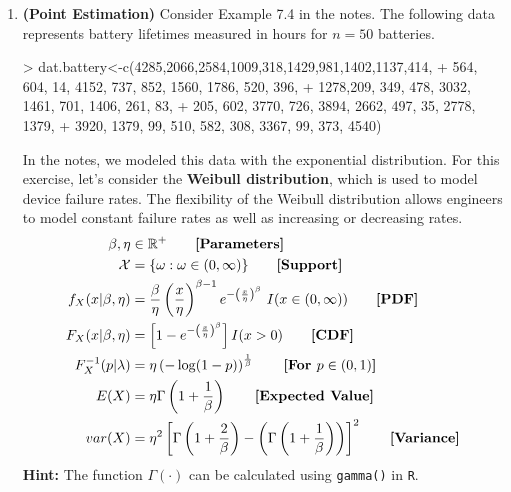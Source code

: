 \documentclass{article}
\begin{document}
\begin{enumerate}
\newpage
\item \textbf{(Point Estimation)} Consider Example 7.4 in the notes.
The following data represents battery lifetimes measured in hours 
for $n=50$ batteries.
\begin{Schunk}
\begin{Sinput}
> dat.battery<-c(4285,2066,2584,1009,318,1429,981,1402,1137,414,
+        564, 604, 14, 4152, 737, 852, 1560, 1786, 520, 396,
+        1278,209, 349, 478, 3032, 1461, 701, 1406, 261, 83,
+        205, 602, 3770, 726, 3894, 2662, 497, 35, 2778, 1379,
+        3920, 1379, 99, 510, 582, 308, 3367, 99, 373, 4540)
\end{Sinput}
\end{Schunk}
In the notes, we modeled this data with the exponential distribution. For this exercise, let's
consider the \textbf{Weibull distribution}, which is used to model device failure rates.
The flexibility of the Weibull distribution allows engineers to model constant failure rates as 
well as increasing or decreasing rates.
\begin{align*}
\beta, \eta &\in \mathbb{R}^+ \tag*{\textbf{[Parameters]}}\\
\mathcal{X}&= \{\omega: \omega \in (0,\infty)\} \tag*{\textbf{[Support]}}\\
f_X(x|\beta,\eta) &= \frac{\beta}{\eta} \left(\frac{x}{\eta}\right)^{\beta-1} e^{-\left(\frac{x}{\eta}\right)^\beta}~ I(x \in (0,\infty)) \tag*{\textbf{[PDF]}}\\
F_X(x|\beta,\eta) &=  \left[1- e^{-\left(\frac{x}{\eta}\right)^\beta}\right]I(x>0)\tag*{\textbf{[CDF]}}\\
F_X^{-1}(p|\lambda)&=\eta \left(-\log(1-p)\right)^{\frac{1}{\beta}}\tag*{\textbf{[For $p \in (0,1)$]}}\\
E(X) &= \eta \Gamma\left( 1+ \frac{1}{\beta}\right)\tag*{\textbf{[Expected Value]}}\\
var(X) &= \eta^2 \left[\Gamma\left( 1+ \frac{2}{\beta}\right)-\left(\Gamma\left( 1+ \frac{1}{\beta}\right)\right)\right]^2 \tag*{\textbf{[Variance]}}\\
\end{align*}
\textbf{Hint:} The function $\Gamma(\cdot)$ can be calculated using \texttt{gamma()} in \texttt{R}.

\end{enumerate}
\end{document}
